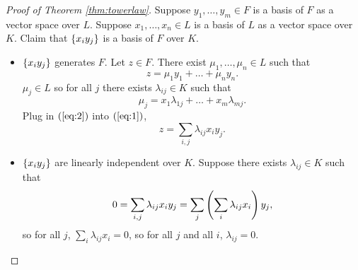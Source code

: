 \begin{proof}[Proof of Theorem \ref{thm:towerlaw}]
Suppose $ y_1, \dots, y_m \in F $ is a basis of $ F $ as a vector space over $ L $. Suppose $ x_1, \dots, x_n \in L $ is a basis of $ L $ as a vector space over $ K $. Claim that $ \left\{ x_iy_j \right\} $ is a basis of $ F $ over $ K $.
\begin{itemize}
\item $ \left\{ x_iy_j \right\} $ generates $ F $. Let $ z \in F $. There exist $ \mu_1, \dots, \mu_n \in L $ such that
\begin{equation}
\label{eq:1}
z = \mu_1y_1 + \dots + \mu_ny_n.
\end{equation}
$ \mu_j \in L $ so for all $ j $ there exists $ \lambda_{ij} \in K $ such that
\begin{equation}
\label{eq:2}
\mu_j = x_1\lambda_{1j} + \dots + x_m\lambda_{mj}.
\end{equation}
Plug in $ \left( \ref{eq:2} \right) $ into $ \left( \ref{eq:1} \right) $,
$$ z = \sum_{i, j} \lambda_{ij}x_iy_j. $$
\item $ \left\{ x_iy_j \right\} $ are linearly independent over $ K $. Suppose there exists $ \lambda_{ij} \in K $ such that
$$ 0 = \sum_{i, j} \lambda_{ij}x_iy_j = \sum_j \left( \sum_i \lambda_{ij}x_i \right)y_j, $$
so for all $ j $, $ \sum_i \lambda_{ij}x_i = 0 $, so for all $ j $ and all $ i $, $ \lambda_{ij} = 0 $.
\end{itemize}
\end{proof}

